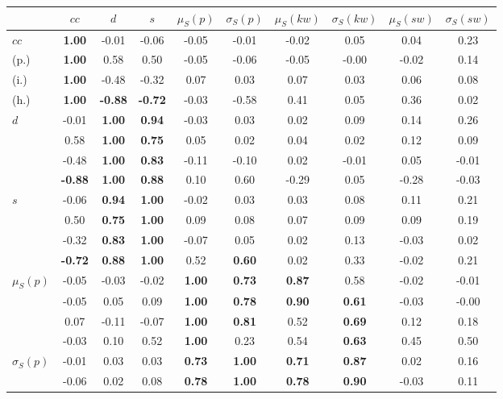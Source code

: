 \begin{table*}[h!]
\begin{center}
\begin{tabular}{| l || c | c | c | c | c | c | c | c | c |}\hline
 & $cc$ & $d$ & $s$ & $\mu_S(p)$ & $\sigma_S(p)$ & $\mu_S(kw)$ & $\sigma_S(kw)$ & $\mu_S(sw)$ & $\sigma_S(sw)$ \\\hline\hline
$cc$ & {\bf 1.00} & -0.01 & -0.06 & -0.05 & -0.01 & -0.02 & 0.05 & 0.04 & 0.23 \\
(p.) & {\bf 1.00} & 0.58 & 0.50 & -0.05 & -0.06 & -0.05 & -0.00 & -0.02 & 0.14 \\
(i.) & {\bf 1.00} & -0.48 & -0.32 & 0.07 & 0.03 & 0.07 & 0.03 & 0.06 & 0.08 \\
(h.) & {\bf 1.00} & {\bf -0.88} & {\bf -0.72} & -0.03 & -0.58 & 0.41 & 0.05 & 0.36 & 0.02 \\\hline
$d$ & -0.01 & {\bf 1.00} & {\bf 0.94} & -0.03 & 0.03 & 0.02 & 0.09 & 0.14 & 0.26 \\
 & 0.58 & {\bf 1.00} & {\bf 0.75} & 0.05 & 0.02 & 0.04 & 0.02 & 0.12 & 0.09 \\
 & -0.48 & {\bf 1.00} & {\bf 0.83} & -0.11 & -0.10 & 0.02 & -0.01 & 0.05 & -0.01 \\
 & {\bf -0.88} & {\bf 1.00} & {\bf 0.88} & 0.10 & 0.60 & -0.29 & 0.05 & -0.28 & -0.03 \\\hline
$s$ & -0.06 & {\bf 0.94} & {\bf 1.00} & -0.02 & 0.03 & 0.03 & 0.08 & 0.11 & 0.21 \\
 & 0.50 & {\bf 0.75} & {\bf 1.00} & 0.09 & 0.08 & 0.07 & 0.09 & 0.09 & 0.19 \\
 & -0.32 & {\bf 0.83} & {\bf 1.00} & -0.07 & 0.05 & 0.02 & 0.13 & -0.03 & 0.02 \\
 & {\bf -0.72} & {\bf 0.88} & {\bf 1.00} & 0.52 & {\bf 0.60} & 0.02 & 0.33 & -0.02 & 0.21 \\\hline
$\mu_S(p)$ & -0.05 & -0.03 & -0.02 & {\bf 1.00} & {\bf 0.73} & {\bf 0.87} & 0.58 & -0.02 & -0.01 \\
 & -0.05 & 0.05 & 0.09 & {\bf 1.00} & {\bf 0.78} & {\bf 0.90} & {\bf 0.61} & -0.03 & -0.00 \\
 & 0.07 & -0.11 & -0.07 & {\bf 1.00} & {\bf 0.81} & 0.52 & {\bf 0.69} & 0.12 & 0.18 \\
 & -0.03 & 0.10 & 0.52 & {\bf 1.00} & 0.23 & 0.54 & {\bf 0.63} & 0.45 & 0.50 \\\hline
$\sigma_S(p)$ & -0.01 & 0.03 & 0.03 & {\bf 0.73} & {\bf 1.00} & {\bf 0.71} & {\bf 0.87} & 0.02 & 0.16 \\
 & -0.06 & 0.02 & 0.08 & {\bf 0.78} & {\bf 1.00} & {\bf 0.78} & {\bf 0.90} & -0.03 & 0.11 \\

\end{tabular}
\end{center}
\end{table*}
